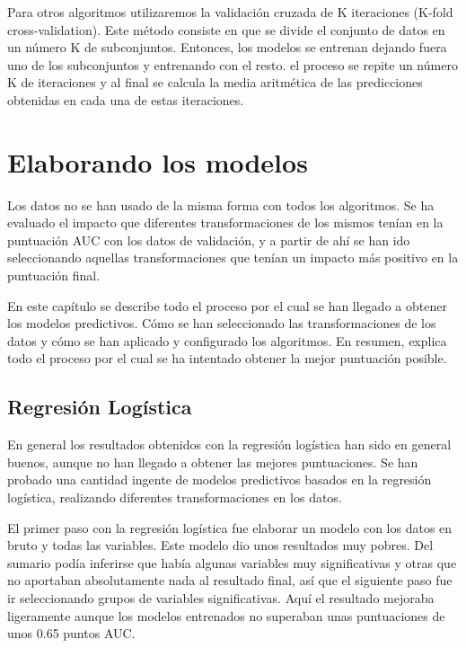 \documentclass[11pt,a4paper,spanish]{article} %
\begin{document}
Para otros algoritmos utilizaremos la validación cruzada de K iteraciones (K-fold cross-validation). Este método consiste en que se divide el conjunto de datos en un número K de subconjuntos. Entonces, los modelos se entrenan dejando fuera uno de los subconjuntos y entrenando con el resto. el proceso se repite un número K de iteraciones y al final se calcula la media aritmética de las predicciones obtenidas en cada una de estas iteraciones. 

\newpage



\section{Elaborando los modelos}
Los datos no se han usado de la misma forma con todos los algoritmos. Se ha evaluado el impacto que diferentes transformaciones de los mismos tenían en la puntuación AUC con los datos de validación, y a partir de ahí se han ido seleccionando aquellas transformaciones que tenían un impacto más positivo en la puntuación final. 

En este capítulo se describe todo el proceso por el cual se han llegado a obtener los modelos predictivos. Cómo se han seleccionado las transformaciones de los datos y cómo se han aplicado y configurado los algoritmos. En resumen, explica todo el proceso por el cual se ha intentado obtener la mejor puntuación posible. 



\subsection{Regresión Logística}
En general los resultados obtenidos con la regresión logística han sido en general buenos, aunque no han llegado a obtener las mejores puntuaciones. Se han probado una cantidad ingente de modelos predictivos basados en la regresión logística, realizando diferentes transformaciones en los datos.

El primer paso con la regresión logística fue elaborar un modelo con los datos en bruto y todas las variables. Este modelo dio unos resultados muy pobres. Del sumario podía inferirse que había algunas variables muy significativas y otras que no aportaban absolutamente nada al resultado final, así que el siguiente paso fue ir seleccionando grupos de variables significativas. Aquí el resultado mejoraba ligeramente aunque los modelos entrenados no superaban unas puntuaciones de unos 0.65 puntos AUC. 
\end{document}
